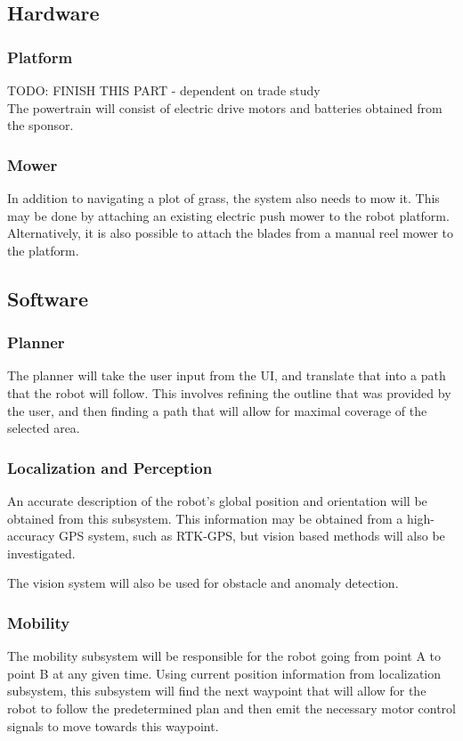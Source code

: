 \documentclass{article}
\begin{document}
	\subsection{Hardware}
		\subsubsection{Platform}
		TODO: FINISH THIS PART - dependent on trade study \\ 
			The powertrain will consist of electric drive motors and batteries obtained from the sponsor. 
			
		\subsubsection{Mower}
			In addition to navigating a plot of grass, the system also needs to mow it. This may be done by attaching an existing electric push mower to the robot platform. Alternatively, it is also possible to attach the blades from a manual reel mower to the platform. 
	
	\subsection{Software}
		\subsubsection{Planner}
			The planner will take the user input from the UI, and translate that into a path that the robot will follow. This involves refining the outline that was provided by the user, and then finding a path that will allow for maximal coverage of the selected area. 
			
		\subsubsection{Localization and Perception}
			An accurate description of the robot's global position and orientation will be obtained from this subsystem. This information may be obtained from a high-accuracy GPS system, such as RTK-GPS, but vision based methods will also be investigated. 
			
			The vision system will also be used for obstacle and anomaly detection. 
		
		\subsubsection{Mobility}
			The mobility subsystem will be responsible for the robot going from point A to point B at any given time. Using current position information from localization subsystem, this subsystem will find the next waypoint that will allow for the robot to follow the predetermined plan and then emit the necessary motor control signals to move towards this waypoint. 
\end{document}
